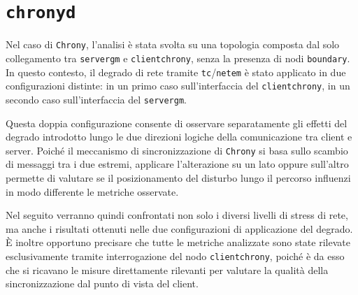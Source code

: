 \section{\texttt{chronyd}}
Nel caso di \texttt{Chrony}, l’analisi è stata svolta su una topologia composta
dal solo collegamento tra \texttt{servergm} e \texttt{clientchrony}, senza la presenza
di nodi \texttt{boundary}. In questo contesto, il degrado di rete tramite
\texttt{tc}/\texttt{netem} è stato applicato in due configurazioni distinte: in un
primo caso sull’interfaccia del \texttt{clientchrony}, in un secondo caso sull’interfaccia
del \texttt{servergm}.

Questa doppia configurazione consente di osservare separatamente gli effetti del
degrado introdotto lungo le due direzioni logiche della comunicazione tra client
e server. Poiché il meccanismo di sincronizzazione di \texttt{Chrony} si basa
sullo scambio di messaggi tra i due estremi, applicare l’alterazione su un lato oppure
sull’altro permette di valutare se il posizionamento del disturbo lungo il percorso
influenzi in modo differente le metriche osservate.

Nel seguito verranno quindi confrontati non solo i diversi livelli di stress di rete,
ma anche i risultati ottenuti nelle due configurazioni di applicazione del
degrado. È inoltre opportuno precisare che tutte le metriche analizzate sono state
rilevate esclusivamente tramite interrogazione del nodo \texttt{clientchrony}, poiché
è da esso che si ricavano le misure direttamente rilevanti per valutare la qualità
della sincronizzazione dal punto di vista del client.

